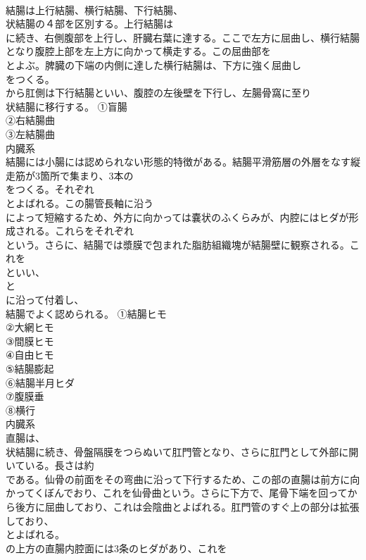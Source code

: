 \documentclass[8pt]{extreport}
\begin{document}
\begin{CJK}{UTF8}{min}
\\	結腸は上行結腸、横行結腸、下行結腸、
\\	状結腸の４部を区別する。上行結腸は
\\	に続き、右側腹部を上行し、肝臓右葉に達する。ここで左方に屈曲し、横行結腸となり腹腔上部を左上方に向かって横走する。この屈曲部を
\\	とよぶ。脾臓の下端の内側に達した横行結腸は、下方に強く屈曲し
\\	をつくる。
\\	から肛側は下行結腸といい、腹腔の左後壁を下行し、左腸骨窩に至り
\\	状結腸に移行する。	①盲腸
\\	②右結腸曲
\\	③左結腸曲
\\	内臓系
\\	結腸には小腸には認められない形態的特徴がある。結腸平滑筋層の外層をなす縦走筋が3箇所で集まり、3本の
\\	をつくる。それぞれ
\\	とよばれる。この腸管長軸に沿う
\\	によって短縮するため、外方に向かっては嚢状のふくらみが、内腔にはヒダが形成される。これらをそれぞれ
\\	という。さらに、結腸では漿膜で包まれた脂肪組織塊が結腸壁に観察される。これを
\\	といい、
\\	と
\\	に沿って付着し、
\\	結腸でよく認められる。	①結腸ヒモ
\\	②大網ヒモ
\\	③間膜ヒモ
\\	④自由ヒモ
\\	⑤結腸膨起
\\	⑥結腸半月ヒダ
\\	⑦腹膜垂
\\	⑧横行
\\	内臓系
\\	直腸は、
\\	状結腸に続き、骨盤隔膜をつらぬいて肛門管となり、さらに肛門として外部に開いている。長さは約
\\	である。仙骨の前面をその弯曲に沿って下行するため、この部の直腸は前方に向かってくぼんでおり、これを仙骨曲という。さらに下方で、尾骨下端を回ってから後方に屈曲しており、これは会陰曲とよばれる。肛門管のすぐ上の部分は拡張しており、
\\	とよばれる。
\\	の上方の直腸内腔面には3条のヒダがあり、これを

\end{CJK}
\end{document}
